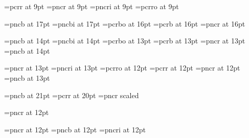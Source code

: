 \font\ninett=pcrr at 9pt
\let\indtt=\ninett
\font\indrm=pncr at 9pt
\font\indit=pncri at 9pt
\font\indsl=pcrro at 9pt
\let\indsf=\indrm
\let\indbf=\indrm
\let\indsc=\indrm

\font\chaprm=pncb at 17pt
\font\chapit=pncbi at 17pt
\font\chapsl=pcrbo at 16pt
\font\chaptt=pcrb at 16pt
\font\chapsf=pncr at 16pt
\let\chapbf=\chaprm
\def\chapfonts{\baselineskip=19pt%
  \let\tenrm=\chaprm \let\tenit=\chapit \let\tensl=\chapsl 
  \let\tenbf=\chapbf \let\tentt=\chaptt \let\smallcaps=\chapsc
  \let\tensf=\chapsf \let\teni=\chapi \let\tensy=\chapsy
  \resetmathfonts}


\font\secrm=pncb at 14pt
\font\secit=pncbi at 14pt
\font\secsl=pcrbo at 13pt
\font\sectt=pcrb at 13pt
\font\secsf=pncr at 13pt
\font\secbf=pncb at 14pt

\font\ssecrm=pncr at 13pt
\font\ssecit=pncri at 13pt
\font\ssecsl=pcrro at 12pt
\font\ssectt=pcrr at 12pt
\font\ssecsf=pncr at 12pt
\font\ssecbf=pncb at 13pt

\font\titlerm=pncb at 21pt
\font\titlett=pcrr at 20pt
\font\authorrm=pncr scaled 

\font\truesecrm=pncr at 12pt

\font\shortcontrm=pncr at 12pt 
\font\shortcontbf=pncb at 12pt 
\font\shortcontsl=pncri at 12pt

\def\smartitalicx{\ifx\next,\else\ifx\next-\else\ifx\next.\else\/\fi\fi\fi}
\def\smartitalic#1{{\it #1}\futurelet\next\smartitalicx}
%
\def\smartslantx{\ifx\next,\else\ifx\next-\else\ifx\next.\else\/\fi\fi\fi}
\def\smartslant#1{{\sl #1}\futurelet\next\smartslantx}

\let\i=\smartitalic
\let\var=\smartslant
\let\dfn=\smartitalic
\let\emph=\smartitalic
\let\cite=\smartitalic

